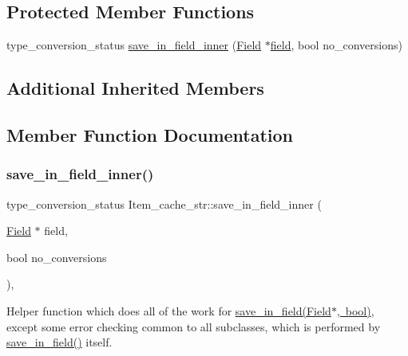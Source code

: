 \subsection*{Protected Member Functions}
\begin{DoxyCompactItemize}
\item 
type\+\_\+conversion\+\_\+status \mbox{\hyperlink{classItem__cache__str_ac6c7bc5886dd787254f9621e46cc2c17}{save\+\_\+in\+\_\+field\+\_\+inner}} (\mbox{\hyperlink{classField}{Field}} $\ast$\mbox{\hyperlink{classItem__cache_aec4011e0239387bff54d31814c1d4f43}{field}}, bool no\+\_\+conversions)
\end{DoxyCompactItemize}
\subsection*{Additional Inherited Members}


\subsection{Member Function Documentation}
\mbox{\label{classItem__cache__str_ac6c7bc5886dd787254f9621e46cc2c17}} 
\subsubsection{\texorpdfstring{save\+\_\+in\+\_\+field\+\_\+inner()}{save\_in\_field\_inner()}}
{\footnotesize\ttfamily type\+\_\+conversion\+\_\+status Item\+\_\+cache\+\_\+str\+::save\+\_\+in\+\_\+field\+\_\+inner (\begin{DoxyParamCaption}\item[{\mbox{\hyperlink{classField}{Field}} $\ast$}]{field,  }\item[{bool}]{no\+\_\+conversions }\end{DoxyParamCaption})\hspace{0.3cm}{\ttfamily [protected]}, {\ttfamily [virtual]}}

Helper function which does all of the work for \mbox{\hyperlink{classItem_acf4c1888a07e9e0dd5787283c6569545}{save\+\_\+in\+\_\+field(\+Field$\ast$, bool)}}, except some error checking common to all subclasses, which is performed by \mbox{\hyperlink{classItem_acf4c1888a07e9e0dd5787283c6569545}{save\+\_\+in\+\_\+field()}} itself.

